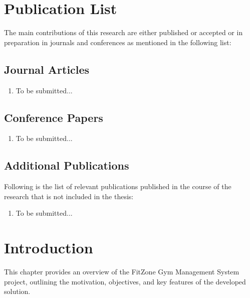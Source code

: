 \documentclass[12pt,a4paper]{report}
\begin{document}
\newpage

\chapter*{Publication List}

The main contributions of this research are either published or accepted or in preparation in journals and conferences as mentioned in the following list:

\section*{Journal Articles}
\begin{enumerate}
\item To be submitted...
\end{enumerate}

\section*{Conference Papers}
\begin{enumerate}
\item To be submitted...
\end{enumerate}

\section*{Additional Publications}
Following is the list of relevant publications published in the course of the research that is not included in the thesis:
\begin{enumerate}
\item To be submitted...
\end{enumerate}

\newpage

\tableofcontents
\newpage

\listoffigures
\newpage

\listoftables
\newpage

\chapter{Introduction}
\label{ch:introduction}

This chapter provides an overview of the FitZone Gym Management System project, outlining the motivation, objectives, and key features of the developed solution.
\end{document}

